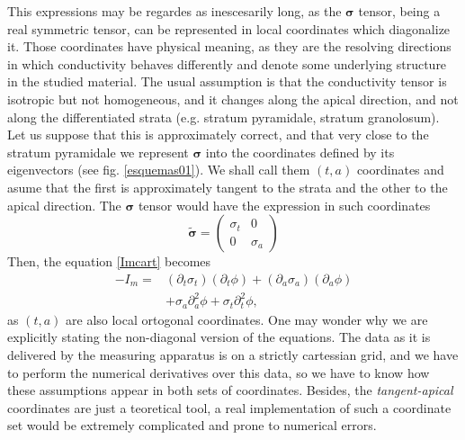 \documentclass{article}
\newcommand{\cond}{\boldsymbol{\sigma}}
\begin{document}
This expressions may be regardes as inescesarily long, as the 
$\cond$ tensor, being a real symmetric tensor, can be represented
in local coordinates which diagonalize it. Those coordinates have
physical meaning, as they are the resolving directions in which
conductivity behaves differently and denote some underlying structure
in the studied material. The usual assumption is that 
the conductivity tensor is isotropic but not homogeneous, and it 
changes along the apical direction, and not along the 
differentiated strata (e.g. stratum pyramidale, stratum granolosum).
Let us suppose that this is approximately correct, and that very close
to the stratum pyramidale we represent $\cond$ into the coordinates
defined by its eigenvectors (see fig. \ref{esquemas01}).
 We shall call them $(t,a)$ coordinates
and asume that the first is approximately tangent to the
strata and the other to the apical direction. The $\cond$ tensor would 
have the expression in such coordinates
\begin{equation}
\tilde{\cond}=
\begin{pmatrix}
\sigma_t & 0 \\
0 & \sigma_a
\end{pmatrix}
\end{equation} 
Then, the equation \ref{Imcart} becomes
\begin{equation}\label{Imapic}
\begin{split}
-I_m= & (\partial_t \sigma_{t}) (\partial_t \phi) +
(\partial_a \sigma_{a}) (\partial_a \phi)  \\
& + \sigma_{a} \partial_a^2 \phi + \sigma_{t} \partial_t^2 \phi, 
\end{split}
\end{equation}
as $(t,a)$ are also local ortogonal coordinates. 
One may wonder why we are explicitly stating the non-diagonal 
version of the equations. The data as it is delivered by
the measuring apparatus is on a strictly cartessian grid, and
we have to perform the numerical derivatives over this data, so
we have to know how these assumptions appear in both sets
of coordinates. Besides, the \emph{tangent-apical} coordinates
are just a teoretical tool, a real implementation of such a coordinate
set would be extremely complicated and prone to numerical errors. 
\end{document}
